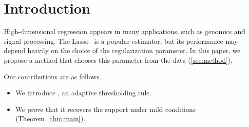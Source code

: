 \section{Introduction}\label{sec:intro}
High-dimensional regression appears in many applications, such as genomics and signal processing.
The Lasso~\cite{tibshirani1996} is a popular estimator, but its performance may depend heavily on the choice of the regularization parameter.
In this paper, we propose a method that chooses this parameter from the data (\cref{sec:method}).

Our contributions are as follows.
\begin{itemize}
  \item We introduce \method{}, an adaptive thresholding rule.
  \item We prove that it recovers the support under mild conditions (Theorem~\ref{thm:main}).
\end{itemize}
